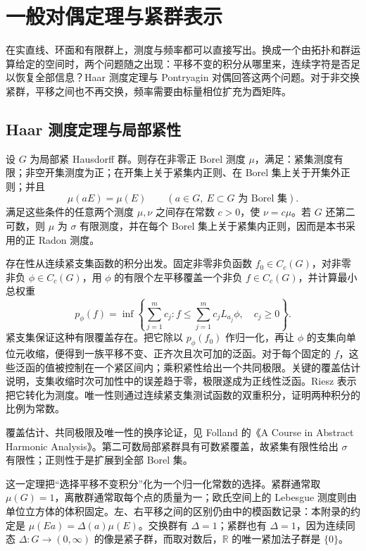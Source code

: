 \section{一般对偶定理与紧群表示}
\label{b2:sec:I205}

在实直线、环面和有限群上，测度与频率都可以直接写出。换成一个由拓扑和群运算给定的空间时，两个问题随之出现：平移不变的积分从哪里来，连续字符是否足以恢复全部信息？Haar 测度定理与 Pontryagin 对偶回答这两个问题。对于非交换紧群，平移之间也不再交换，频率需要由标量相位扩充为酉矩阵。

\subsection{Haar 测度定理与局部紧性}
\label{b2:subsec:I20501}

\begin{claim}
\label{b2:claim:I5-haar}
设 \(G\) 为局部紧 Hausdorff 群。则存在非零正 Borel 测度 \(\mu\)，满足：紧集测度有限；非空开集测度为正；在开集上关于紧集内正则、在 Borel 集上关于开集外正则；并且
\[
 \mu(aE)=\mu(E)\qquad(a\in G,\ E\subset G\text{ 为 Borel 集}).
\]
满足这些条件的任意两个测度 \(\mu,\nu\) 之间存在常数 \(c>0\)，使 \(\nu=c\mu\)。若 \(G\) 还第二可数，则 \(\mu\) 为 \(\sigma\) 有限测度，并在每个 Borel 集上关于紧集内正则，因而是本书采用的正 Radon 测度。
\end{claim}
\begin{proofsketch}
存在性从连续紧支集函数的积分出发。固定非零非负函数 \(f_0\in C_c(G)\)，对非零非负 \(\phi\in C_c(G)\)，用 \(\phi\) 的有限个左平移覆盖一个非负 \(f\in C_c(G)\)，并计算最小总权重
\[
 p_\phi(f)=\inf\left\{\sum_{j=1}^m c_j:
 f\le\sum_{j=1}^m c_jL_{a_j}\phi,\quad c_j\ge0\right\}.
\]
紧支集保证这种有限覆盖存在。把它除以 \(p_\phi(f_0)\) 作归一化，再让 \(\phi\) 的支集向单位元收缩，便得到一族平移不变、正齐次且次可加的泛函。对于每个固定的 \(f\)，这些泛函的值被控制在一个紧区间内；乘积紧性给出一个共同极限。关键的覆盖估计说明，支集收缩时次可加性中的误差趋于零，极限遂成为正线性泛函。Riesz 表示把它转化为测度。唯一性则通过连续紧支集测试函数的双重积分，证明两种积分的比例为常数。

覆盖估计、共同极限及唯一性的换序论证，见 Folland 的《A Course in Abstract Harmonic Analysis》\cite[Section 2.2]{Folland2016Abstract}。第二可数局部紧群具有可数紧覆盖，故紧集有限性给出 \(\sigma\) 有限性；正则性于是扩展到全部 Borel 集。
\end{proofsketch}

这一定理把“选择平移不变积分”化为一个归一化常数的选择。紧群通常取 \(\mu(G)=1\)，离散群通常取每个点的质量为一；欧氏空间上的 Lebesgue 测度则由单位立方体的体积固定。左、右平移之间的区别仍由中的模函数记录：本附录的约定是 \(\mu(Ea)=\Delta(a)\mu(E)\)。交换群有 \(\Delta=1\)；紧群也有 \(\Delta=1\)，因为连续同态 \(\Delta:G\to(0,\infty)\) 的像是紧子群，而取对数后，\(\mathbb R\) 的唯一紧加法子群是 \(\{0\}\)。

